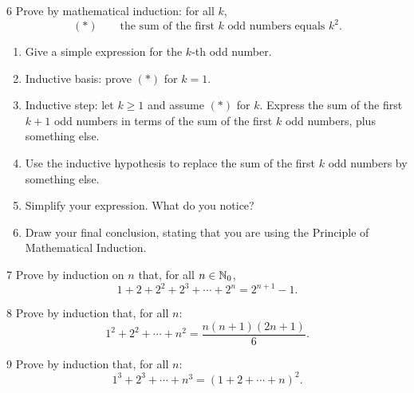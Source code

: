 \begin{exercise}{6}
    Prove by mathematical induction: for all $k$,
    \[
        (*)\qquad \text{the sum of the first $k$ odd numbers equals } k^2.
    \]
    \begin{enumerate}[label=(\alph*)]
        \item Give a simple expression for the $k$-th odd number.
        \item Inductive basis: prove $(*)$ for $k=1$.
        \item Inductive step: let $k\ge1$ and assume $(*)$ for $k$. Express the
              sum of the first $k+1$ odd numbers in terms of the sum of the first
              $k$ odd numbers, plus something else.
        \item Use the inductive hypothesis to replace the sum of the first $k$ odd
              numbers by something else.
        \item Simplify your expression. What do you notice?
        \item Draw your final conclusion, stating that you are using the
              Principle of Mathematical Induction.
    \end{enumerate}
\end{exercise}

\begin{exercise}{7}
    Prove by induction on $n$ that, for all $n\in\mathbb{N}_0$,
    \[
        1+2+2^2+2^3+\cdots+2^n = 2^{n+1}-1.
    \]
\end{exercise}

\begin{exercise}{8}
    Prove by induction that, for all $n$:
    \[
        1^2+2^2+\cdots+n^2 = \frac{n(n+1)(2n+1)}{6}.
    \]
\end{exercise}

\begin{exercise}{9}
    Prove by induction that, for all $n$:
    \[
        1^3+2^3+\cdots+n^3 = (1+2+\cdots+n)^2.
    \]
\end{exercise}

